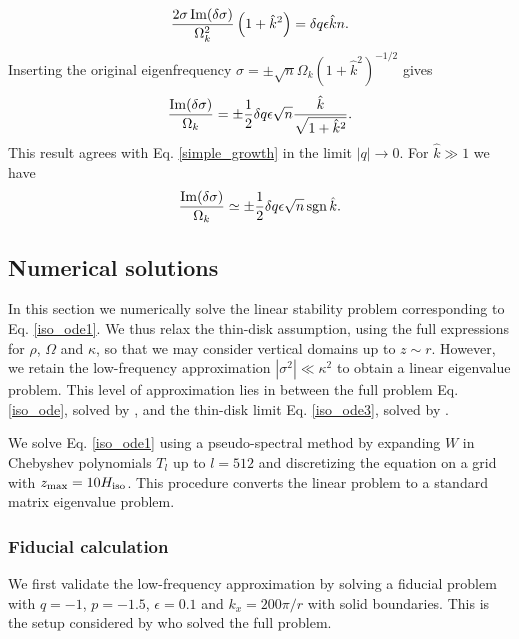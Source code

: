  \begin{align}
  \frac{2\sigma\operatorname{Im}(\delta\sigma)}{\Omega_k^2}
  \left(1+\hat{k}^2\right) = \delta q \epsilon \hat{k} n.
 \end{align}
Inserting the original eigenfrequency $\sigma = \pm
\sqrt{n}\Omega_k(1+\hat{k}^2)^{-1/2}$ gives
\begin{align}
  \frac{\operatorname{Im}(\delta\sigma)}{\Omega_k} = \pm \frac{1}{2}\delta q \epsilon
  \sqrt{n} \frac{\hat{k}}{\sqrt{1+\hat{k}^2}}. 
\end{align}
This result agrees with Eq. \ref{simple_growth} in the limit
$|q|\to0$. 
For $\hat{k}\gg 1$ we have
\begin{align}
  \frac{\operatorname{Im}(\delta\sigma)}{\Omega_k} \simeq \pm \frac{1}{2}\delta q \epsilon
  \sqrt{n} \operatorname{sgn}{\hat{k}}. 
\end{align}

\subsection{Numerical solutions}
In this section we numerically solve the linear stability problem
corresponding to Eq. \ref{iso_ode1}. We thus relax the thin-disk
assumption, using the full expressions for $\rho$, $\Omega$ and
$\kappa$, so that we may consider vertical domains up to $z\sim r$.
However, we retain the low-frequency approximation
$|\sigma^2|\ll\kappa^2$ to obtain a linear eigenvalue problem. This
level of approximation lies in between the full problem 
Eq. \ref{iso_ode}, solved by \cite{mcnally14}, and the thin-disk
limit Eq. \ref{iso_ode3}, solved by \cite{nelson13}.   

We solve Eq. \ref{iso_ode1} using a pseudo-spectral method by
expanding $W$ in Chebyshev polynomials $T_l$ up to $l=512$ and
discretizing the equation on a grid with
$z_\mathrm{max}=10H_\mathrm{iso}$. This procedure converts the linear problem
to a standard matrix eigenvalue problem. %

\subsubsection{Fiducial calculation}
We first validate the low-frequency approximation by solving a 
fiducial problem with $q=-1$, $p=-1.5$, $\epsilon=0.1$ and $k_x =
200\pi/r$ with solid boundaries. This is the setup considered by
\cite{mcnally14} who solved the full problem. 

